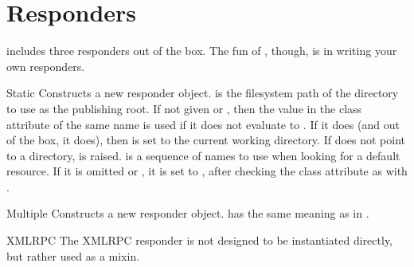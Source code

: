 \section{Responders \label{responders}}

 includes three responders out of the box. The fun of
, though, is in writing your own responders.

\begin{classdesc}{Static}{} Constructs a new
 responder object.  is the filesystem path of the
directory to use as the publishing root. If not given or , then the
value in the class attribute of the same name is used if it does not evaluate to
. If it does (and out of the box, it does), then  is set
to the current working directory. If  does not point to a directory,
 is raised.  is a sequence of names to use
when looking for a default resource. If it is omitted or , it is set
to , after checking the class attribute as
with . \end{classdesc}

\begin{classdesc}{Multiple}{} Constructs a new 
responder object.  has the same meaning as in
.\end{classdesc}

\begin{classdesc*}{XMLRPC}
The XMLRPC responder is not designed to be instantiated directly, but rather
used as a mixin.
\end{classdesc*}






